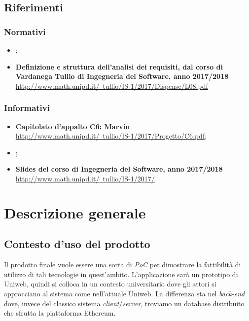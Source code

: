 \subsection{Riferimenti}
\subsubsection{Normativi}
\begin{itemize}
	\item \textbf{\NdP{}};
	\item \textbf{Definizione e struttura dell'analisi dei requisiti, dal corso di Vardanega Tullio di Ingegneria del Software, anno 2017/2018}
	\href{http://www.math.unipd.it/~tullio/IS-1/2017/Dispense/L08.pdf}{http://www.math.unipd.it/~tullio/IS-1/2017/Dispense/L08.pdf}
	
\end{itemize}

\subsubsection{Informativi}
\begin{itemize}
	\item \textbf{Capitolato d'appalto C6: Marvin}\\ 
	\href{http://www.math.unipd.it/~tullio/IS-1/2017/Progetto/C6.pdf}{http://www.math.unipd.it/~tullio/IS-1/2017/Progetto/C6.pdf};
	\item \textbf{\SdF};
	\item \textbf{Slides del corso di Ingegneria del Software, anno 2017/2018}\\
	\href{http://www.math.unipd.it/~tullio/IS-1/2017/}{http://www.math.unipd.it/~tullio/IS-1/2017/}
\end{itemize}

\section{Descrizione generale}
	\subsection{Contesto d'uso del prodotto}
	Il prodotto finale vuole essere una sorta di \emph{PoC} per dimostrare la fattibilità di utilizzo di tali tecnologie in quest’ambito. L’applicazione sarà un prototipo di Uniweb, quindi si colloca in un contesto universitario dove gli attori si approcciano al sistema come nell’attuale Uniweb. La differenza sta nel \emph{back-end} dove, invece del classico sistema \emph{client}/\emph{server}, troviamo un database distribuito che sfrutta la piattaforma Ethereum.
	
